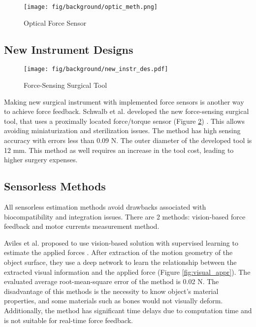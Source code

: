 \begin{figure}[h]
	\begin{center}
	\texttt{[image: fig/background/optic\_meth.png]}
	\end{center}
	\vspace{-4mm}
	\caption[Optical Force Sensor]
	{Optical Force Sensor \cite{_micro_2004}}
	\label{fig:opt_sen}
	\vspace{-2mm}
\end{figure}

\subsection{New Instrument Designs}
\begin{figure}[h]
	\begin{center}
	\texttt{[image: fig/background/new\_instr\_des.pdf]}
	\end{center}
	\vspace{-4mm}
	\caption[Force-Sensing Surgical Tool]
	{ Force-Sensing Surgical Tool \cite{schwalb_forcesensing_2017}}
	\label{fig:force_sen_tool}
	\vspace{-2mm}
\end{figure}

Making new surgical instrument with implemented force sensors is another way to achieve force feedback. Schwalb et al. developed the new force-sensing surgical tool, that uses a proximally located force/torque sensor (Figure \ref{fig:force_sen_tool}) \cite{schwalb_forcesensing_2017}. This allows avoiding miniaturization and sterilization issues. The method has high sensing accuracy with errors less than 0.09 N. The outer diameter of the developed tool is 12 mm. This method as well requires an increase in the tool cost, leading to higher surgery expenses.

\subsection{Sensorless Methods}

All sensorless estimation methods avoid drawbacks associated with biocompatibility and integration issues. There are 2 methods: vision-based force feedback and motor currents measurement method.

Aviles et al. proposed to use vision-based solution with supervised learning to estimate the applied forces \cite{aviles_towards_2017}. After extraction of the motion geometry of the object surface, they use a deep network to learn the relationship between the extracted visual information and the applied force (Figure \ref{fig:visual_appr}). The evaluated average root-mean-square error of the method is 0.02 N.  The disadvantage of this methods is the necessity to know object’s material properties, and some materials such as bones would not visually deform. Additionally, the method has significant time delays due to computation time and is not suitable for real-time force feedback. 

